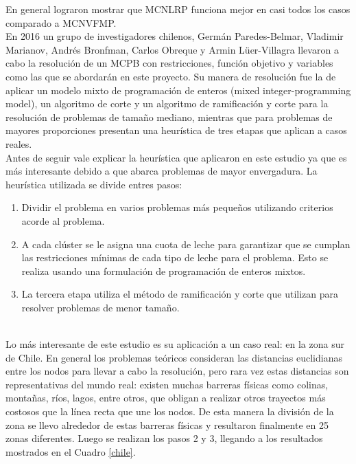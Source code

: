 \documentclass[letter, 10pt]{article}
\begin{document}
En general lograron mostrar que MCNLRP funciona mejor en casi todos los casos comparado a MCNVFMP. \\

En 2016 un grupo de investigadores chilenos, Germ\'an Paredes-Belmar, Vladimir Marianov, Andr\'es Bronfman, Carlos Obreque y Armin L\"uer-Villagra llevaron a cabo la resoluci\'on de un MCPB con restricciones, funci\'on objetivo y variables como las que se abordar\'an en este proyecto\cite{MCPB}. Su manera de resoluci\'on fue la de aplicar un modelo mixto de programaci\'on de enteros (mixed integer-programming model), un algoritmo de corte y un algoritmo de ramificaci\'on y corte para la resoluci\'on de problemas de tama\~{n}o mediano, mientras que para problemas de mayores proporciones presentan una heur\'istica de tres etapas que aplican a casos reales. \\

Antes de seguir vale explicar la heur\'istica que aplicaron en este estudio ya que es m\'as interesante debido a que abarca problemas de mayor envergadura. La heur\'istica utilizada se divide entres pasos:
\begin{enumerate}
    \item Dividir el problema en varios problemas m\'as peque\~{n}os utilizando criterios acorde al problema.
    \item A cada cl\'uster se le asigna una cuota de leche para garantizar que se cumplan las restricciones m\'inimas de cada tipo de leche para el problema. Esto se realiza usando una formulaci\'on de programaci\'on de enteros mixtos.
    \item La tercera etapa utiliza el m\'etodo de ramificaci\'on y corte que utilizan para resolver problemas de menor tama\~{n}o.
\end{enumerate} \\

Lo m\'as interesante de este estudio es su aplicaci\'on a un caso real: en la zona sur de Chile. En general los problemas te\'oricos consideran las distancias euclidianas entre los nodos para llevar a cabo la resoluci\'on, pero rara vez estas distancias son representativas del mundo real: existen muchas barreras f\'isicas como colinas, monta\~{n}as, r\'ios, lagos, entre otros, que obligan a realizar otros trayectos m\'as costosos que la l\'inea recta que une los nodos. De esta manera la divisi\'on de la zona se llevo alrededor de estas barreras f\'isicas y resultaron finalmente en 25 zonas diferentes. Luego se realizan los pasos 2 y 3, llegando a los resultados mostrados en el Cuadro \ref{chile}.
\end{document}
